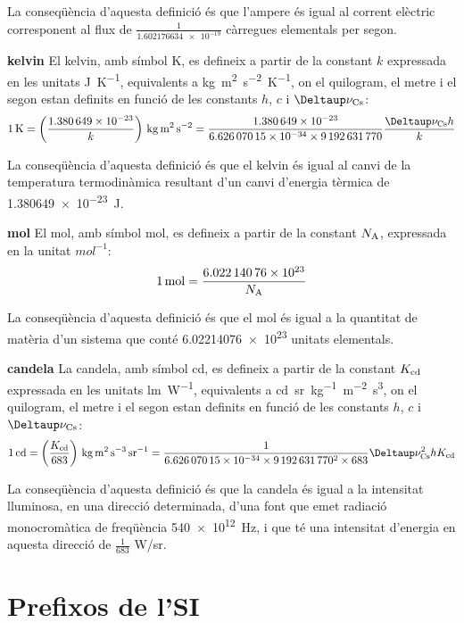 \begin{list}{}
    La conseqüència d'aquesta definició és que l'ampere és igual al corrent elèctric corresponent al flux de $\frac{1}{\num{1,602176634 e-19}}$  càrregues elementals per segon.

   \item[\textbf{kelvin}]  El kelvin, amb símbol K, es defineix a partir de la constant $k$ expressada en les unitats \si{J.K^{-1}},  equivalents a \si{kg.m^2.s^{-2}.K^{-1}},  on el quilogram, el metre i el segon estan definits en funció de les constants $h$, $c$ i $\Deltaup\nu\ped{Cs}$:
       \[
            \SI{1}{K} = \left(\frac{\num{1,380649e-23}}{k}\right)\si{\,kg.m^2.s^{-2}} = \frac{\num{1,380649e-23}}{\num{6,62607015 e-34}\times\num{9192631770}} \frac{\Deltaup\nu\ped{Cs} h}{k}
       \]

    La conseqüència d'aquesta definició és que el kelvin és igual al canvi de la temperatura termodinàmica resultant d'un canvi d'energia tèrmica de \SI{1,380649e-23}{J}.

   \item[\textbf{mol}]  El mol, amb símbol mol, es defineix a partir de la constant $N_\mathrm{A}$, expressada en la unitat  $\si{mol^{-1}}$:
       \[
            \SI{1}{mol} = \frac{\num{6,02214076 e23}}{N_\mathrm{A}}
       \]

    La conseqüència d'aquesta definició és que el mol és igual a la quantitat de matèria d'un sistema que conté
    \num{6,02214076 e23} unitats elementals.

   \item[\textbf{candela}] La candela, amb símbol cd, es defineix a partir de la constant $K_\mathrm{cd}$ expressada en les unitats \si{lm.W^{-1}},  equivalents a \si{cd.sr.kg^{-1}.m^{-2}.s^3},  on el quilogram, el metre i el segon estan definits en funció de les constants $h$, $c$ i $\Deltaup\nu\ped{Cs}$:
       \[
            \SI{1}{cd} = \left(\frac{K\ped{cd}}{683}\right)\si{\,kg.m^2.s^{-3}.sr^{-1}} = \frac{1}{\num{6,62607015 e-34}\times\num{9192631770}^2\times 683} \Deltaup\nu\ped{Cs}^2 h K\ped{cd}
       \]

    La conseqüència d'aquesta definició és que la candela és igual a la intensitat lluminosa, en una direcció determinada,   d'una font que emet radiació monocromàtica de freqüència \SI{540e12}{Hz}, i
   que té una intensitat d'energia en aquesta direcció de $\frac{1}{683}$ \si{W/sr}.
\end{list}



\section{Prefixos de l'SI}

